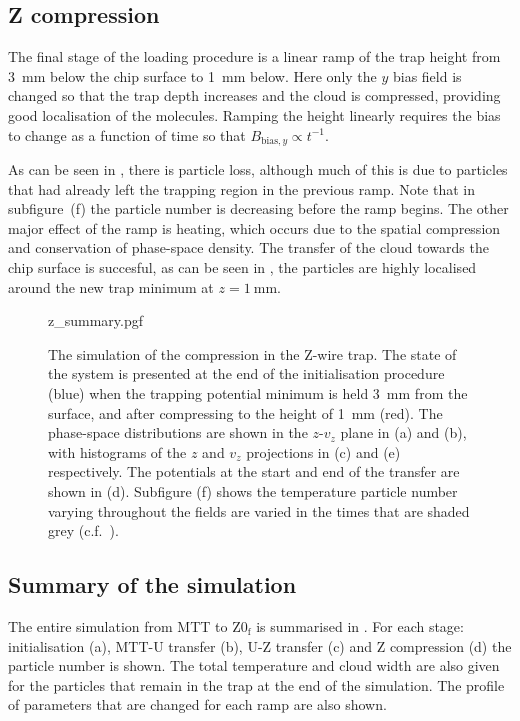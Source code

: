 \subsection{Z compression}

The final stage of the loading procedure is a linear ramp of the trap height
from \SI{3}{\milli\meter} below the chip surface to \SI{1}{\milli\meter} below.
Here only the $y$ bias field is changed so  that the trap depth
increases and the cloud is compressed, providing good localisation of the
molecules. Ramping the height linearly requires the bias to change as a
function of time so that $B_{\text{bias}, y} \propto t^{-1}$.

As can be seen in , there is particle loss,
although much of this is due to particles that had already left the trapping
region in the previous ramp. Note that in subfigure~(f) the particle number is
decreasing before the ramp begins. The other major effect of the ramp is
heating, which occurs due to the spatial compression and conservation of
phase-space density.
%
The transfer of the cloud towards the chip surface is succesful, as can be seen
in , the particles are highly localised around
the new trap minimum at $z=\SI{1}{\milli\meter}$.

\begin{figure}[p]
\centering
  {z_summary.pgf}
  \caption{
    The simulation of the compression in the Z-wire trap. The state of the
    system is presented at the end of the initialisation procedure (blue) when
    the trapping potential minimum is held \SI{3}{\milli\meter} from the
    surface, and after compressing to the height of \SI{1}{\milli\meter} (red).
    The phase-space distributions are shown in the $z$-$v_z$ plane in (a) and
    (b), with histograms of the $z$ and $v_z$ projections in (c) and (e)
    respectively. The potentials at the start and end of the transfer are shown
    in (d). Subfigure (f) shows the temperature particle number varying
    throughout the fields are varied in the times that are shaded grey
    (c.f.~).
  }
  \label{design:fig:zsim}
\end{figure}

\subsection{Summary of the simulation}

The entire simulation from MTT to $\mathrm{Z0_f}$ is summarised in
. For each stage: initialisation (a), MTT-U
transfer (b), U-Z transfer (c) and Z compression (d) the particle number is
shown. The total temperature and cloud width are also given for the particles
that remain in the trap at the end of the simulation. The profile of parameters
that are changed for each ramp are also shown. 


